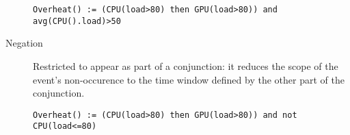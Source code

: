 \begin{description}
	\begin{lstlisting}[language=iotdsl]
Overheat() := (CPU(load>80) then GPU(load>80)) and avg(CPU().load)>50
\end{lstlisting}
	
	\item[Negation] Restricted to appear as part of a conjunction: it reduces the scope of the event's non-occurence to the time window defined by the other part of the conjunction.
	
	\begin{lstlisting}[language=iotdsl]
Overheat() := (CPU(load>80) then GPU(load>80)) and not CPU(load<=80)
\end{lstlisting}
\end{description}
